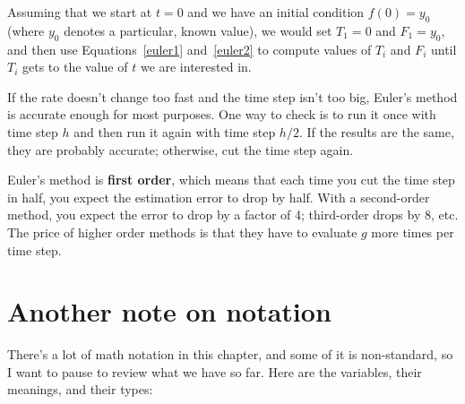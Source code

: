 \documentclass{book}
\begin{document}
Assuming that we start at $t=0$ and we have an initial condition $f(0)
= y_0$ (where $y_0$ denotes a particular, known value), we would set
$T_1 = 0$ and $F_1 = y_0$, and then use Equations~\ref{euler1} and~\ref{euler2}
to
compute values of $T_i$ and $F_i$ until $T_i$ 
gets to the value of $t$ we are interested in.

If the rate doesn't change too fast and the time step isn't
too big, Euler's method is accurate enough for most purposes. One
way to check is to run it once with time step $h$ and then run it
again with time step $h/2$. If the results are the same, they are
probably accurate; otherwise, cut the time step again.

Euler's method is {\bf first order}, which means that each time you
cut the time step in half, you expect the estimation error to drop by
half. With a second-order method, you expect the error to drop by a
factor of 4; third-order drops by 8, etc. The price of higher order
methods is that they have to evaluate $g$ more times per time step.


\section{Another note on notation}

There's a lot of math notation in this chapter, and some of it is
non-standard, so I want to pause to review what we have so far.
Here are the variables, their meanings, and their types:
\end{document}
